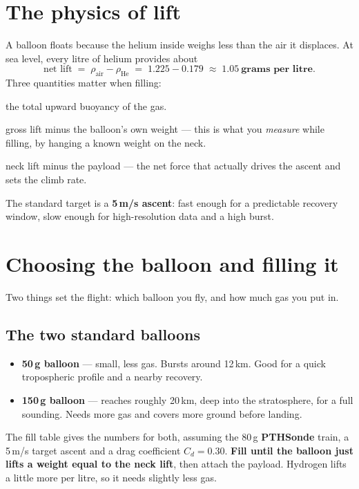 \documentclass[11pt,openany]{report}
\newcommand{\PTH}{\texorpdfstring{\textbf{PTH}\textcolor{tlorange}{\textbf{Sonde}}}{PTHSonde}}
\begin{document}
\section{The physics of lift}
A balloon floats because the helium inside weighs less than the air it displaces.
At sea level, every litre of helium provides about
\[
  \text{net lift} \;=\; \rho_{\text{air}} - \rho_{\text{He}}
  \;=\; 1.225 - 0.179 \;\approx\; \mathbf{1.05\ \text{grams per litre}}.
\]
Three quantities matter when filling:
\begin{description}[leftmargin=1.5cm,style=nextline]
  \item[Gross lift] the total upward buoyancy of the gas.
  \item[Neck (nozzle) lift] gross lift minus the balloon's own weight --- this is what
        you \emph{measure} while filling, by hanging a known weight on the neck.
  \item[Free lift] neck lift minus the payload --- the net force that actually drives
        the ascent and sets the climb rate.
\end{description}
The standard target is a \textbf{5\,m/s ascent}: fast enough for a predictable
recovery window, slow enough for high-resolution data and a high burst.

\section{Choosing the balloon and filling it}
Two things set the flight: which balloon you fly, and how much gas you put in.

\subsection{The two standard balloons}
\begin{itemize}
  \item \textbf{50\,g balloon} --- small, less gas. Bursts around 12\,km. Good for a
        quick tropospheric profile and a nearby recovery.
  \item \textbf{150\,g balloon} --- reaches roughly 20\,km, deep into the stratosphere,
        for a full sounding. Needs more gas and covers more ground before landing.
\end{itemize}

The fill table gives the numbers for both, assuming the 80\,g \PTH{} train, a
5\,m/s target ascent and a drag coefficient $C_d=0.30$. \textbf{Fill until the balloon
just lifts a weight equal to the neck lift}, then attach the payload. Hydrogen lifts a
little more per litre, so it needs slightly less gas.
\end{document}
